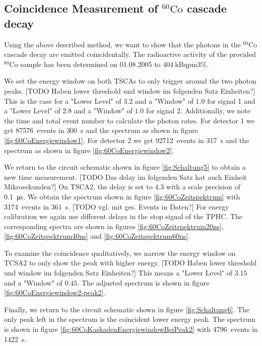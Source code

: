 \subsection{Coincidence Measurement of $^{60}\text{Co}$ cascade decay}
%
Using the above described method, we want to show that the photons in the $^{60}\text{Co}$ cascade decay are emitted coincidentally.
The radioactive activity of the provided $^{60}\text{Co}$ sample has been determined on 01.08.2005 to $\SI{404}{\kilo\becquerel \pm 3 \percent}$.
%
\par
%
We set the energy window on both TSCAs to only trigger around the two photon peaks.
[TODO Haben lower threshold und window im folgenden Satz Einheiten?] This is the case for a "Lower Level" of $3.2$ and a "Window" of $1.0$ for signal 1 and a "Lower Level" of $2.8$ and a "Window" of $1.0$ for signal 2.
Additionally, we note the time and total event number to calculate the photon rates.
For detector 1 we get \SI{87576}{events} in \SI{300}{\second} and the spectrum as shown in figure \ref{fig:60CoEnergiewindow1}.
For detector 2 we get \SI{92712}{events} in \SI{317}{\second} and the spectrum as shown in figure \ref{fig:60CoEnergiewindow2}.
%
\par
%
We return to the circuit schematic shown in figure \ref{fig:Schaltung5} to obtain a new time measurement.
[TODO Das delay im folgenden Satz hat auch Einheit Mikrosekunden?] On TSCA2, the delay is set to $4.3$ with a scale precision of \SI{0.1}{\micro\second}.
We obtain the spectrum shown in figure \ref{fig:60CoZeitspektrum} with \SI{3174}{events} in \SI{361}{\second}. [TODO vgl. mit ges. Events in Daten?]
For energy calibration we again use different delays in the stop signal of the TPHC.
The corresponding spectra are shown in figures \ref{fig:60CoZeitspektrum20ns}, \ref{fig:60CoZeitspektrum40ns} and \ref{fig:60CoZeitspektrum60ns}.
%
\par
%
To examine the coincidence qualitatively, we narrow the energy window on TCSA2 to only show the peak with higher energy.
[TODO Haben lower threshold und window im folgenden Satz Einheiten?] This means a "Lower Level" of $3.15$ and a "Window" of $0.45$.
The adjusted spectrum is shown in figure \ref{fig:60CoEnergiewindow2-peak2}.
%
\par
%
Finally, we return to the circuit schematic shown in figure \ref{fig:Schaltung6}.
The only peak left in the spectrum is the coincident lower energy peak.
The spectrum is shown in figure \ref{fig:60CoKaskadenEnergiewindowBeiPeak2} with \SI{4796}{events} in \SI{1422}{\second}.
%
